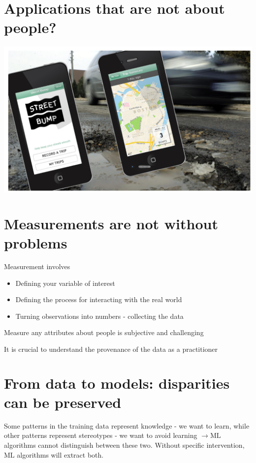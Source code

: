 \documentclass[10pt]{article}
\begin{document}
\section*{Applications that are not about people?}
\begin{center}
\includegraphics[max width=\textwidth]{2024_01_08_7c1a383b1e6170f910e4g-11}
\end{center}

\section*{Measurements are not without problems}
Measurement involves

\begin{itemize}
  \item Defining your variable of interest
  \item Defining the process for interacting with the real world
  \item Turning observations into numbers - collecting the data
\end{itemize}

Measure any attributes about people is subjective and challenging

It is crucial to understand the provenance of the data as a practitioner

\section*{From data to models: disparities can be preserved}
Some patterns in the training data represent knowledge - we want to learn, while other patterns represent stereotypes - we want to avoid learning $\rightarrow \mathrm{ML}$ algorithms cannot distinguish between these two. Without specific intervention, $\mathrm{ML}$ algorithms will extract both.
\end{document}
